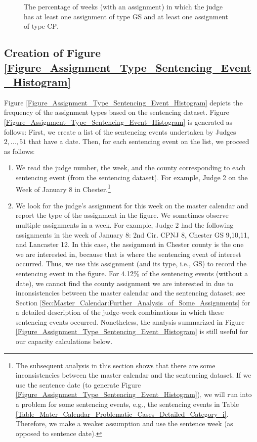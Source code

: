 \documentclass[11pt, oneside]{article}   	%
\theoremstyle{ModifiedStyle}
\begin{document}
\begin{figure}[H]
\begin{minipage}{\textwidth}
				\vspace{-3mm}
				\caption{The percentage of weeks (with an assignment) in which the judge has at least one assignment of type GS and at least one assignment of type CP.}
				\label{Figure_Judge_Schedule_GS_CP_Percentage_Histogram}
			\end{minipage}
		\end{figure}

	\subsection{Creation of Figure \ref{Figure_Assignment_Type_Sentencing_Event_Histogram}}
		Figure \ref{Figure_Assignment_Type_Sentencing_Event_Histogram} depicts the frequency of the assignment types based on the sentencing dataset. Figure \ref{Figure_Assignment_Type_Sentencing_Event_Histogram} is generated as follows: First, we create a list of the sentencing events undertaken by Judges $2,\ldots,51$ that have a date. Then, for each sentencing event on the list, we proceed as follows:
		\begin{enumerate}
			\vspace{-3mm}
			\item We read the judge number, the week, and the county corresponding to each sentencing event (from the sentencing dataset). For example, Judge 2 on the Week of January 8 in Chester.\footnote{The subsequent analysis in this section shows that there are some inconsistencies between the master calendar and the sentencing dataset. If we use the sentence date (to generate Figure \ref{Figure_Assignment_Type_Sentencing_Event_Histogram}), we will run into a problem for some sentencing events, e.g., the sentencing events in Table \ref{Table_Mater_Calendar_Problematic_Cases_Detailed_Category_i}. Therefore, we make a weaker assumption and use the sentence week (as opposed to sentence date).}
			\vspace{-2mm}
			\item We look for the judge's assignment for this week on the master calendar and report the type of the assignment in the figure. We sometimes observe multiple assignments in a week. For example, Judge 2 had the following assignments in the week of January 8: 2nd Cir. CPNJ 8, Chester GS 9,10,11, and Lancaster 12. In this case, the assignment in Chester county is the one we are interested in, because that is where the sentencing event of interest occurred. Thus, we use this assignment (and its type, i.e., GS) to record the sentencing event in the figure. For 4.12\% of the sentencing events (without a date), we cannot find the county assignment we are interested in due to inconsistencies between the master calendar and the sentencing dataset; see Section \ref{Sec:Master_Calendar:Further_Analysis_of_Some_Assignments} for a detailed description of the judge-week combinations in which these sentencing events occurred. Nonetheless, the analysis summarized in Figure \ref{Figure_Assignment_Type_Sentencing_Event_Histogram} is still useful for our capacity calculations below.
		\end{enumerate}
\end{document}
